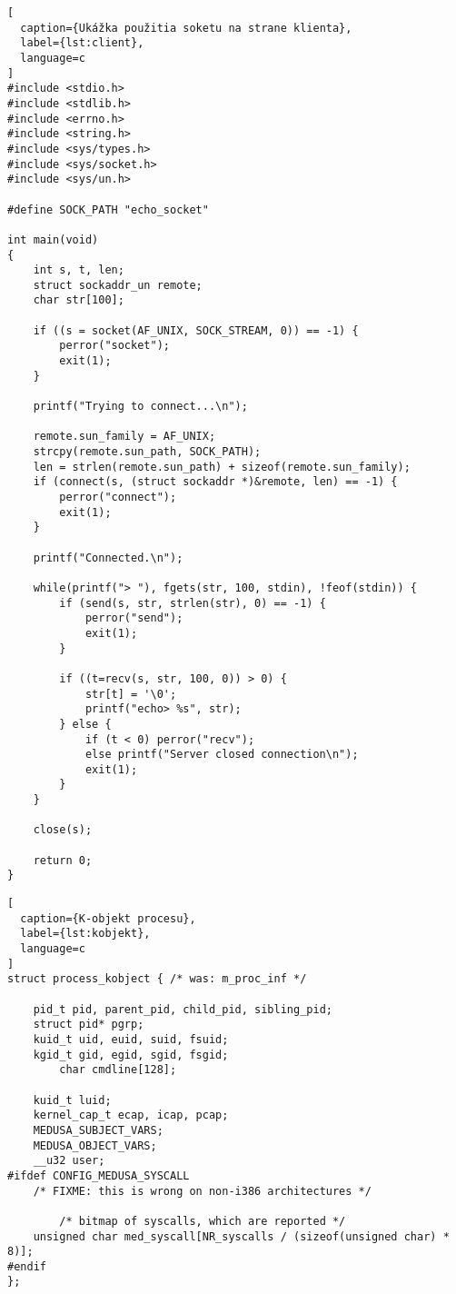 \begin{lstlisting}[
  caption={Ukážka použitia soketu na strane klienta},
  label={lst:client},
  language=c
]
#include <stdio.h>
#include <stdlib.h>
#include <errno.h>
#include <string.h>
#include <sys/types.h>
#include <sys/socket.h>
#include <sys/un.h>

#define SOCK_PATH "echo_socket"

int main(void)
{
    int s, t, len;
    struct sockaddr_un remote;
    char str[100];

    if ((s = socket(AF_UNIX, SOCK_STREAM, 0)) == -1) {
        perror("socket");
        exit(1);
    }

    printf("Trying to connect...\n");

    remote.sun_family = AF_UNIX;
    strcpy(remote.sun_path, SOCK_PATH);
    len = strlen(remote.sun_path) + sizeof(remote.sun_family);
    if (connect(s, (struct sockaddr *)&remote, len) == -1) {
        perror("connect");
        exit(1);
    }

    printf("Connected.\n");

    while(printf("> "), fgets(str, 100, stdin), !feof(stdin)) {
        if (send(s, str, strlen(str), 0) == -1) {
            perror("send");
            exit(1);
        }

        if ((t=recv(s, str, 100, 0)) > 0) {
            str[t] = '\0';
            printf("echo> %s", str);
        } else {
            if (t < 0) perror("recv");
            else printf("Server closed connection\n");
            exit(1);
        }
    }

    close(s);

    return 0;
}
\end{lstlisting}

\begin{lstlisting}[
  caption={K-objekt procesu},
  label={lst:kobjekt},
  language=c
]
struct process_kobject { /* was: m_proc_inf */

	pid_t pid, parent_pid, child_pid, sibling_pid;
	struct pid* pgrp;
	kuid_t uid, euid, suid, fsuid;
	kgid_t gid, egid, sgid, fsgid;
        char cmdline[128];

	kuid_t luid;
	kernel_cap_t ecap, icap, pcap;
	MEDUSA_SUBJECT_VARS;
	MEDUSA_OBJECT_VARS;
	__u32 user;
#ifdef CONFIG_MEDUSA_SYSCALL
	/* FIXME: this is wrong on non-i386 architectures */

		/* bitmap of syscalls, which are reported */
	unsigned char med_syscall[NR_syscalls / (sizeof(unsigned char) * 8)];
#endif
};
\end{lstlisting}

